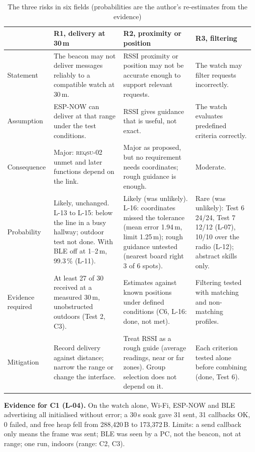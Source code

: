 \IfFileExists{IEEEtran.cls}{\documentclass[conference]{IEEEtran}}{\documentclass[10pt,twocolumn]{article}}
\newcommand{\req}[1]{\textsc{reqsu-}#1}
\begin{document}
\begin{table}[!t]
\caption{The three risks in six fields (probabilities are the author's re-estimates from the evidence)}
\centering\footnotesize
\setlength{\tabcolsep}{3pt}
\begin{tabularx}{\textwidth}{@{}l Y Y Y@{}}
\toprule
 & R1, delivery at 30\,m & R2, proximity or position & R3, filtering\\
\midrule
Statement & The beacon may not deliver messages reliably to a compatible watch at 30\,m. & RSSI proximity or position may not be accurate enough to support relevant requests. & The watch may filter requests incorrectly.\\
Assumption & ESP-NOW can deliver at that range under the test conditions. & RSSI gives guidance that is useful, not exact. & The watch evaluates predefined criteria correctly.\\
Consequence & Major: \req{02} unmet and later functions depend on the link. & Major as proposed, but no requirement needs coordinates; rough guidance is enough. & Moderate.\\
Probability & Likely, unchanged. L-13 to L-15: below the line in a busy hallway; outdoor test not done. With BLE off at 1--2\,m, 99.3\,\% (L-11). & Likely (was unlikely). L-16: coordinates missed the tolerance (mean error 1.94\,m, limit 1.25\,m); rough guidance untested (nearest board right 3 of 6 spots). & Rare (was unlikely): Test 6 24/24, Test 7 12/12 (L-07), 10/10 over the radio (L-12); abstract skills only.\\
Evidence required & At least 27 of 30 received at a measured 30\,m, unobstructed outdoors (Test 2, C3). & Estimates against known positions under defined conditions (C6, L-16: done, not met). & Filtering tested with matching and non-matching profiles.\\
Mitigation & Record delivery against distance; narrow the range or change the interface. & Treat RSSI as a rough guide (average readings, near or far zones). Group selection does not depend on it. & Each criterion tested alone before combining (done, Test 6).\\
\bottomrule
\end{tabularx}

\end{table}

\textbf{Evidence for C1 (L-04).} On the watch alone, Wi-Fi, ESP-NOW and BLE advertising all initialised without error; a 30\,s soak gave 31 sent, 31 callbacks OK, 0 failed, and free heap fell from 288{,}420\,B to 173{,}372\,B. Limits: a send callback only means the frame was sent; BLE was seen by a PC, not the beacon, not at range; one run, indoors (range: C2, C3).
\end{document}
